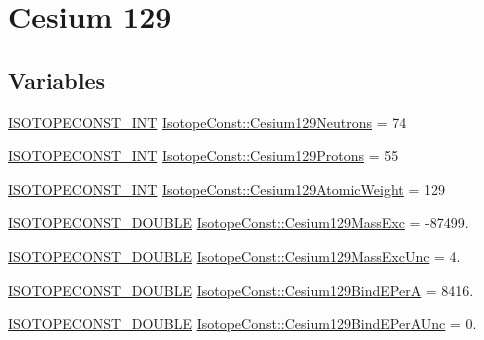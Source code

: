 \hypertarget{group___isotope_const-_cesium-_cs129}{}\section{Cesium 129}
\label{group___isotope_const-_cesium-_cs129}
\subsection*{Variables}
\begin{DoxyCompactItemize}
\item 
\mbox{\hyperlink{group___isotope_const-_macros_ga5f18360b3e99483a35c32d789e62621c}{I\+S\+O\+T\+O\+P\+E\+C\+O\+N\+S\+T\+\_\+\+I\+NT}} \mbox{\hyperlink{group___isotope_const-_cesium-_cs129_gaa60c12eb1cdd73e974636077c01df070}{Isotope\+Const\+::\+Cesium129\+Neutrons}} = 74
\item 
\mbox{\hyperlink{group___isotope_const-_macros_ga5f18360b3e99483a35c32d789e62621c}{I\+S\+O\+T\+O\+P\+E\+C\+O\+N\+S\+T\+\_\+\+I\+NT}} \mbox{\hyperlink{group___isotope_const-_cesium-_cs129_gad8af7438b61c65aac0365903d44223c2}{Isotope\+Const\+::\+Cesium129\+Protons}} = 55
\item 
\mbox{\hyperlink{group___isotope_const-_macros_ga5f18360b3e99483a35c32d789e62621c}{I\+S\+O\+T\+O\+P\+E\+C\+O\+N\+S\+T\+\_\+\+I\+NT}} \mbox{\hyperlink{group___isotope_const-_cesium-_cs129_ga2947ad4ef8bdc54a9989e10d9d321c0c}{Isotope\+Const\+::\+Cesium129\+Atomic\+Weight}} = 129
\item 
\mbox{\hyperlink{group___isotope_const-_macros_ga8f45a7272ce02c0b4c65c44636ed719a}{I\+S\+O\+T\+O\+P\+E\+C\+O\+N\+S\+T\+\_\+\+D\+O\+U\+B\+LE}} \mbox{\hyperlink{group___isotope_const-_cesium-_cs129_gac45fe4a6d66f1b82b34288364e511224}{Isotope\+Const\+::\+Cesium129\+Mass\+Exc}} = -\/87499.
\item 
\mbox{\hyperlink{group___isotope_const-_macros_ga8f45a7272ce02c0b4c65c44636ed719a}{I\+S\+O\+T\+O\+P\+E\+C\+O\+N\+S\+T\+\_\+\+D\+O\+U\+B\+LE}} \mbox{\hyperlink{group___isotope_const-_cesium-_cs129_gab97d240347ad9603e7c7e8aac6165bfb}{Isotope\+Const\+::\+Cesium129\+Mass\+Exc\+Unc}} = 4.
\item 
\mbox{\hyperlink{group___isotope_const-_macros_ga8f45a7272ce02c0b4c65c44636ed719a}{I\+S\+O\+T\+O\+P\+E\+C\+O\+N\+S\+T\+\_\+\+D\+O\+U\+B\+LE}} \mbox{\hyperlink{group___isotope_const-_cesium-_cs129_ga38ded6beb6db6a27b0e47b3acc79e76d}{Isotope\+Const\+::\+Cesium129\+Bind\+E\+PerA}} = 8416.
\item 
\mbox{\hyperlink{group___isotope_const-_macros_ga8f45a7272ce02c0b4c65c44636ed719a}{I\+S\+O\+T\+O\+P\+E\+C\+O\+N\+S\+T\+\_\+\+D\+O\+U\+B\+LE}} \mbox{\hyperlink{group___isotope_const-_cesium-_cs129_gadf67acb97d81844b9ae5df913897cf7b}{Isotope\+Const\+::\+Cesium129\+Bind\+E\+Per\+A\+Unc}} = 0.

\end{DoxyCompactItemize}
